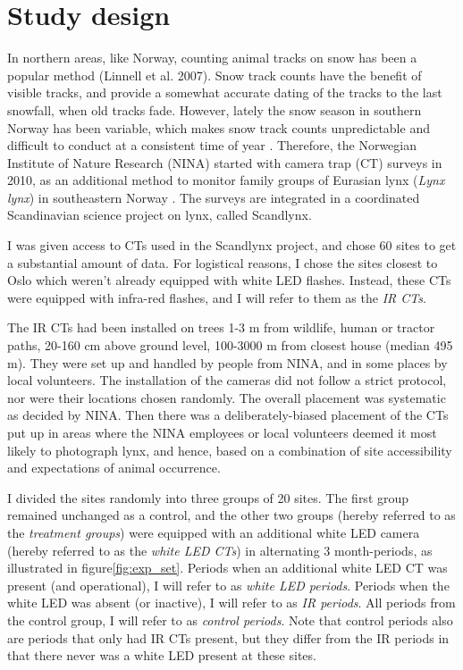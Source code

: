 \section{Study design} 

In northern areas, like Norway, counting animal tracks on snow has been a popular method (Linnell et al. 2007). %
Snow track counts have the benefit of visible tracks, and provide a somewhat accurate dating of the tracks to the last snowfall, when old tracks fade.
However, lately the snow season in southern Norway has been variable, which makes snow track counts unpredictable and difficult to conduct at a consistent time of year \autocite{Odden2015}.
Therefore, the Norwegian Institute of Nature Research (NINA) started with camera trap (CT) surveys in 2010,  as an additional method to monitor family groups of Eurasian lynx (\textit{Lynx lynx}) in southeastern Norway  \autocite{Odden2015}. The surveys are integrated in a coordinated Scandinavian science project on lynx, called Scandlynx. 


I was given access to CTs used in the Scandlynx project, and chose 60 sites to get a substantial amount of data.
For logistical reasons, I chose the sites closest to Oslo which weren't already equipped with white LED flashes. 
Instead, these CTs were equipped with infra-red flashes, and I will refer to them as the \emph{IR CTs}.


The IR CTs had been installed on trees 1-3 m from wildlife, human or tractor paths, 20-160 cm above ground level, 100-3000 m from closest house (median 495 m).
They were set up and handled by people from NINA, and in some places by local volunteers. 
The installation of the cameras did not follow a strict protocol, nor were their locations chosen randomly. The overall placement was systematic as decided by NINA. 
Then there was a deliberately-biased placement of the CTs put up in areas where the NINA employees or local volunteers deemed it most likely to photograph lynx, and hence, based on a combination of site accessibility and expectations of animal occurrence. %


I divided the sites randomly into three groups of 20 sites.
The first group remained unchanged as a control, and the other two groups (hereby referred to as the \emph{treatment groups}) were equipped with an additional white LED camera (hereby referred to as the \emph{white LED CTs}) in alternating 3 month-periods, as illustrated in figure\vref{fig:exp_set}.
Periods when an additional white LED CT was present (and operational), I will refer to as \emph{white LED periods}.
Periods when the white LED was absent (or inactive), I will refer to as \emph{IR periods}.
All periods from the control group, I will refer to as \emph{control periods}.
Note that control periods also are periods that only had IR CTs present, but they differ from the IR periods in that there never was a white LED present at these sites.

